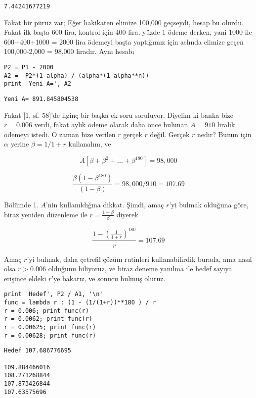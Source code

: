 \documentclass[12pt,fleqn]{article}\usepackage{../../common}
\begin{document}
\begin{verbatim}
7.44241677219
\end{verbatim}

Fakat bir pürüz var; Eğer hakikaten elimize 100,000 geçseydi, hesap bu
olurdu. Fakat ilk başta 600 lira, kontrol için 400 lira, yüzde 1 ödeme derken,
yani 1000 ile 600+400+1000 = 2000 lira ödemeyi başta yaptığımız için aslında
elimize geçen 100,000-2,000 = 98,000 liradır. Aynı hesabı

\begin{verbatim}
P2 = P1 - 2000
A2 =  P2*(1-alpha) / (alpha*(1-alpha**n))
print 'Yeni A=', A2
\end{verbatim}

\begin{verbatim}
Yeni A= 891.845804538
\end{verbatim}

Fakat [1, sf. 58]'de ilginç bir başka ek soru soruluyor. Diyelim ki banka
bize $r=0.006$ verdi, fakat aylık ödeme olarak daha önce bulunan $A=910$ liralık
ödemeyi istedi. O zaman bize verilen $r$ gerçek $r$ değil. Gerçek $r$ nedir?
Bunun için $\alpha$ yerine $\beta=1/1+r$ kullanalım, ve

$$ A [\beta + \beta^2 + ... + \beta^{180}] = 98,000 $$

$$ \frac{\beta (1-\beta^{180})}{(1-\beta)} = 98,000 / 910 = 107.69$$

Bölümde 1. $A$'nin kullanıldığına dikkat. Şimdi, amaç $r$'yi bulmak olduğuna
göre, biraz yeniden düzenleme ile $r = \frac{1-\beta}{\beta}$ diyerek 

$$ \frac{1 - (\frac{1}{1+r})^{180}}{r} = 107.69 $$

Amaç $r$'yi bulmak, daha çetrefil çözüm rutinleri kullanabilirdik burada, ama
nasıl olsa $r > 0.006$ olduğunu biliyoruz, ve biraz deneme yanılma ile hedef
sayıya erişince eldeki $r$'ye bakarız, ve sonucu bulmuş oluruz. 

\begin{verbatim}
print 'Hedef', P2 / A1, '\n'
func = lambda r : (1 - (1/(1+r))**180 ) / r
r = 0.006; print func(r)
r = 0.0062; print func(r)
r = 0.00625; print func(r)
r = 0.00628; print func(r)
\end{verbatim}

\begin{verbatim}
Hedef 107.686776695 

109.884466016
108.271268844
107.873426844
107.63575696
\end{verbatim}
\end{document}
